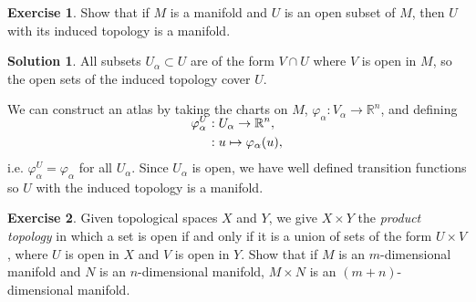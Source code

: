 \documentclass[11pt, a4paper]{article}
\theoremstyle{definition}
\newtheorem{ex}{Exercise}[part]
\newtheorem{sol}{Solution}[part]
\begin{document}
\begin{ex}

Show that if $M$ is a manifold and $U$ is an open subset of $M$, then $U$ with its induced topology is a manifold.

\end{ex}

\begin{sol}

All subsets $U_\alpha \subset U$ are of the form $V \cap U$ where $V$ is open in $M$, so the open sets of the induced topology cover $U$.

We can construct an atlas by taking the charts on $M$, $\varphi_\alpha: V_\alpha \to \mathbb{R}^n$, and defining
\begin{align*}
    \SwapAboveDisplaySkip
    \varphi^U_\alpha&: U_\alpha \to \mathbb{R}^n, \\
                    &: u \mapsto \varphi_\alpha(u),
\end{align*}
i.e. $\varphi^U_\alpha = \varphi_\alpha$ for all $U_\alpha$.
Since $U_\alpha$ is open, we have well defined transition functions so $U$ with the induced topology is a manifold.

\end{sol}

\begin{ex}

Given topological spaces $X$ and $Y$, we give $X \times Y$ the \emph{product topology} in which a set is open if and only if it is a union of sets of the form $U \times V$, where $U$ is open in $X$ and $V$ is open in $Y$. Show that if $M$ is an $m$-dimensional manifold and $N$ is an $n$-dimensional manifold, $M \times N$ is an $(m + n)$-dimensional manifold.

\end{ex}
\end{document}
